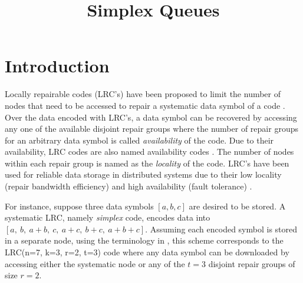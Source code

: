 \documentclass[sigconf,draft]{acmart}
\newcommand\mehmet[1]{\add[MA]{#1}}
\begin{document}

\title{Simplex Queues}
\maketitle
\section{Introduction}
Locally repairable codes (LRC's) have been proposed to limit the number of nodes that need to be accessed to repair a systematic data symbol of a code \cite{rawat2014locality, tamo2014bounds}. Over the data encoded with LRC's, a data symbol can be recovered by accessing any one of the available disjoint repair groups where the number of repair groups for an arbitrary data symbol is called \emph{availability} of the code. Due to their availability, LRC codes are also named availability codes \cite{kadhe2015analyzing}. The number of nodes within each repair group is named as the \emph{locality} of the code. LRC's have been used for reliable data storage in distributed systems due to their low locality (repair bandwidth efficiency) and high availability (fault tolerance) \cite{huang2012erasure, primererasure, sathiamoorthy2013xoring, datta2013storage, li2013erasure, kuijper2014erasure}.

For instance, suppose three data symbols $[a, b, c]$ are desired to be stored. A systematic LRC, namely \emph{simplex} code, encodes data into $[a, \: b, \: a+b, \: c, \: a+c, \: b+c, \: a+b+c]$. Assuming each encoded symbol is stored in a separate node, using the terminology in \cite{kadhe2015analyzing}, this scheme corresponds to the LRC(n=7, k=3, r=2, t=3) code where any data symbol can be downloaded by accessing either the systematic node or any of the $t=3$ disjoint repair groups of size $r=2$.
\end{document}

